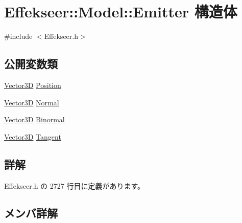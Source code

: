 \hypertarget{struct_effekseer_1_1_model_1_1_emitter}{}\section{Effekseer\+:\+:Model\+:\+:Emitter 構造体}
\label{struct_effekseer_1_1_model_1_1_emitter}


{\ttfamily \#include $<$Effekseer.\+h$>$}

\subsection*{公開変数類}
\begin{DoxyCompactItemize}
\item 
\mbox{\hyperlink{struct_effekseer_1_1_vector3_d}{Vector3D}} \mbox{\hyperlink{struct_effekseer_1_1_model_1_1_emitter_a6279424ea82c1cabc2c5b406f018f790}{Position}}
\item 
\mbox{\hyperlink{struct_effekseer_1_1_vector3_d}{Vector3D}} \mbox{\hyperlink{struct_effekseer_1_1_model_1_1_emitter_a98f905f6c2908fd65aedefc975be677a}{Normal}}
\item 
\mbox{\hyperlink{struct_effekseer_1_1_vector3_d}{Vector3D}} \mbox{\hyperlink{struct_effekseer_1_1_model_1_1_emitter_a092f55d411ff30e52ce759ecc4c2709d}{Binormal}}
\item 
\mbox{\hyperlink{struct_effekseer_1_1_vector3_d}{Vector3D}} \mbox{\hyperlink{struct_effekseer_1_1_model_1_1_emitter_ab4f98e69e1041c999f0f191891fcb140}{Tangent}}
\end{DoxyCompactItemize}


\subsection{詳解}


 Effekseer.\+h の 2727 行目に定義があります。



\subsection{メンバ詳解}
\mbox{\label{struct_effekseer_1_1_model_1_1_emitter_a092f55d411ff30e52ce759ecc4c2709d}} 
